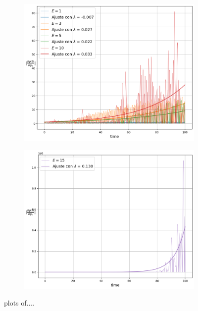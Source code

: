 \documentclass[11pt, twoside]{article} %
\begin{document}
\begin{figure}
    \begin{subfigure}{.5\textwidth}
      \centering
      \includegraphics[width=\linewidth]{plots/coeficientes_lyapunov_1_4.png}
      \label{fig:coeficiente_lyapunov_1_4}
    \end{subfigure}%
    \begin{subfigure}{.5\textwidth}
      \centering
      \includegraphics[width=\linewidth]{plots/coeficientes_lyapunov_5.png}
      \label{fig:coeficiente_lyapunov_5}
    \end{subfigure}
    \caption{plots of....}
    \label{fig:coeficiente_lyapunov}
\end{figure}
\end{document}
